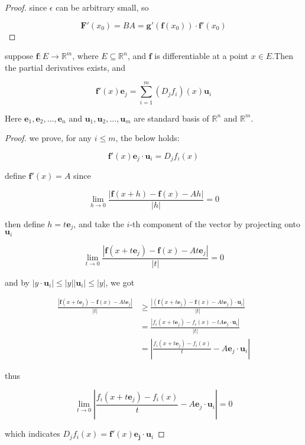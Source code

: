 \begin{proof}
    since $\epsilon $ can be arbitrary small, so

    \[
        \mathbf{F}'(x_0) = BA = \mathbf{g}'(\mathbf{f}(x_0)) \cdot \mathbf{f}'(x_0)
    \]

\end{proof}

\begin{thm}
   suppose $\mathbf{f}: E \to \mathbb{R}^m$, where $E \subseteq \mathbb{R}^n$, and $\mathbf{f}$
   is differentiable at a point $x \in E$.Then the partial derivatives exists, and

   \[
        \mathbf{f}'(x) \mathbf{e}_j = \sum_{i=1}^{m}\left( D_jf_i \right)(x) \mathbf{u}_i
   \]

   Here $\mathbf{e}_1,\mathbf{e}_2, ..., \mathbf{e}_n$ and $\mathbf{u}_1,\mathbf{u}_2, ..., \mathbf{u}_m$
   are standard basis of $\mathbb{R}^n$ and $\mathbb{R}^m$.
\end{thm}

\begin{proof}
    we prove, for any $i \le m$, the below holds:

    \[
        \mathbf{f}'(x) \mathbf{e}_j \cdot \mathbf{u}_i =  D_jf_i (x) 
    \]

    define $\mathbf{f}'(x) = A$
    since 

    \[
        \lim_{h \to 0} \frac{\left| \mathbf{f}(x + h) - \mathbf{f}(x) - Ah \right|}{\left| h \right|} = 0
    \]

    then define $h = t \mathbf{e}_j$, and take the $i$-th component of the vector by projecting onto $\mathbf{u}_i$


    \[
        \lim_{t \to 0} \frac{\left| \mathbf{f}(x + t \mathbf{e}_j) - \mathbf{f}(x) - At \mathbf{e}_j \right|}{\left| t \right|} = 0
    \]

    and by $|y \cdot \mathbf{u}_i| \le |y| |\mathbf{u}_i| \le |y|$, we got

    \begin{align*}
 \frac{\left| \mathbf{f}(x + t \mathbf{e}_j) - \mathbf{f}(x) - At \mathbf{e}_j \right|}{\left| t \right|} & \ge        \frac{\left| \left(\mathbf{f}(x + t \mathbf{e}_j) - \mathbf{f}(x) - At \mathbf{e}_j \right) \cdot \mathbf{u}_i \right|}{\left| t \right|} \\
 &= \frac{\left| f_i(x + t \mathbf{e}_j) - f_i(x) - tA \mathbf{e}_j \cdot \mathbf{u}_i \right|}{\left| t \right|} \\ 
         &= \left| \frac{ f_i(x + t \mathbf{e}_j) - f_i(x)   }{t }- A\mathbf{e}_j  \cdot \mathbf{u}_i \right|
    \end{align*}

    thus 

    \[
        \lim_{t \to 0}\left| \frac{ f_i(x + t \mathbf{e}_j) - f_i(x)   }{t }- A\mathbf{e}_j \cdot \mathbf{u}_i \right| = 0
    \]

    which indicates $D_jf_i(x) = \mathbf{f}'(x) \mathbf{e_j} \cdot \mathbf{u}_i$
\end{proof}

